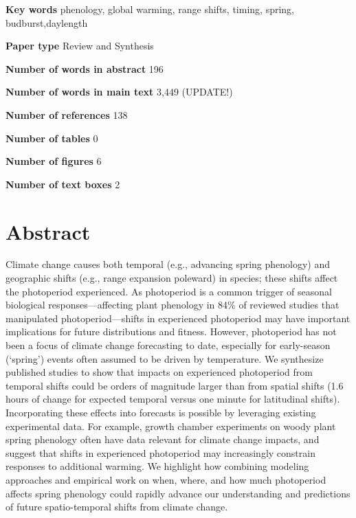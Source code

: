 \documentclass{article}
\begin{document}
\textbf{Key words} phenology, global warming, range shifts, timing, spring, budburst,daylength 

\textbf{Paper type} Review and Synthesis

\textbf{Number of words in abstract} 196

\textbf{Number of words in main text} 3,449 (UPDATE!)

\textbf{Number of references} 138

\textbf{Number of tables} 0

\textbf{Number of figures} 6

\textbf{Number of text boxes} 2







\newpage
\linenumbers
\section*{Abstract}
Climate change causes both temporal (e.g., advancing spring phenology) and geographic shifts (e.g., range expansion poleward) in species; these shifts affect the photoperiod experienced. As photoperiod is a common trigger of seasonal biological responses---affecting plant phenology in 84\% of reviewed studies that manipulated photoperiod---shifts in experienced photoperiod may have important implications for future distributions and fitness. However, photoperiod has not been a focus of climate change forecasting to date, especially for early-season (`spring') events often assumed to be driven by temperature. We synthesize published studies to show that impacts on experienced photoperiod from temporal shifts could be orders of magnitude larger than from spatial shifts (1.6 hours of change for expected temporal versus one minute for latitudinal shifts). Incorporating these effects into forecasts is possible by leveraging existing experimental data. For example, growth chamber experiments on woody plant spring phenology often have data relevant for climate change impacts, and suggest that shifts in experienced photoperiod may increasingly constrain responses to additional warming. We highlight how combining modeling approaches and empirical work on when, where, and how much photoperiod affects spring phenology could rapidly advance our understanding and predictions of future spatio-temporal shifts from climate change.
\end{document}
